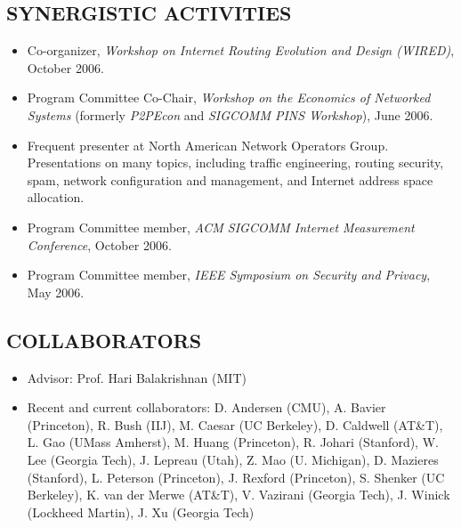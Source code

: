 
\vspace{.1in}

\subsection*{SYNERGISTIC ACTIVITIES} 
\begin{itemize}
\item Co-organizer, {\em Workshop on Internet Routing Evolution and
  Design (WIRED)}, October 2006.

\item Program Committee Co-Chair, {\em Workshop on the Economics of
  Networked Systems} (formerly {\em P2PEcon} and {\em SIGCOMM PINS
  Workshop}), June 2006.

\item Frequent presenter at North American Network Operators Group.
  Presentations on many topics, including traffic engineering, routing
  security, spam, network configuration and management, and Internet
  address space allocation.

\item Program Committee member, {\em ACM SIGCOMM Internet Measurement
  Conference}, October 2006.

\item Program Committee member, {\em IEEE Symposium on Security and
  Privacy}, May 2006.
\end{itemize}

\vspace{.1in}

\subsection*{COLLABORATORS} 

\begin{itemize}
\item
Advisor: Prof. Hari Balakrishnan (MIT)


\item
Recent and current collaborators:
D. Andersen (CMU),
A. Bavier (Princeton),
R. Bush (IIJ),
M. Caesar (UC Berkeley),
D. Caldwell (AT\&T),
L. Gao (UMass Amherst),
M. Huang (Princeton),
R. Johari (Stanford), 
W. Lee (Georgia Tech),
J. Lepreau (Utah),
Z. Mao (U. Michigan),
D. Mazieres (Stanford),
L. Peterson (Princeton),
J. Rexford (Princeton),
S. Shenker (UC Berkeley),
K. van der Merwe (AT\&T),
V. Vazirani (Georgia Tech), 
J. Winick (Lockheed Martin), 
J. Xu (Georgia Tech)
\end{itemize}





